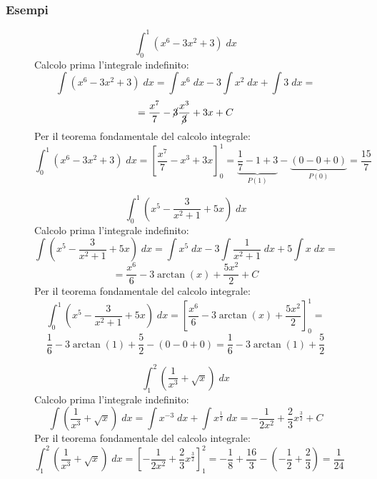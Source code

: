 \documentclass[a4paper]{article}
\theoremstyle{break}
\theoremstyle{break}
\theoremstyle{break}
\theoremstyle{break}
\begin{document}
\subsubsection{Esempi}
\begin{figure}[H]
  \begin{example}
    \[
      \int_{0}^{1} (x^6 - 3x^2 + 3)\; dx
    \] 
    Calcolo prima l'integrale indefinito:
    \[
      \int (x^6 - 3x^2 + 3)\;dx = \int x^6\;dx - 3 \int x^2\;dx + \int 3\;dx =
    \] 
    \[
      = \frac{x^7}{7} - \cancel{3} \frac{x^3}{\cancel{3}} + 3x + C
    \] 
    Per il teorema fondamentale del calcolo integrale:
    \[
      \int_{0}^{1} (x^6 - 3x^2 + 3)\;dx = \left[ \frac{x^7}{7} - x^3 + 3x \right]_{0}^{1} = \underbrace{\frac{1}{7} - 1 + 3}_{P(1)} - \underbrace{(0 - 0 + 0)}_{P(0)} = \frac{15}{7}
    \] 
  \end{example}
\end{figure}

\begin{figure}[H]
  \begin{example}
    \[
      \int_{0}^{1} \left(x^5 - \frac{3}{x^2+1} + 5x \right)\; dx
    \] 
    Calcolo prima l'integrale indefinito:
    \[
      \int \left(x^5 - \frac{3}{x^2+1} + 5x \right)\;dx = \int x^5\;dx - 3 \int \frac{1}{x^2+1}\;dx + 5 \int x\;dx =
    \] 
    \[
      = \frac{x^6}{6} - 3 \arctan(x) + \frac{5x^2}{2} + C
    \] 
    Per il teorema fondamentale del calcolo integrale:
    \[
      \int_{0}^{1} \left(x^5 - \frac{3}{x^2+1} + 5x \right)\;dx = \left[ \frac{x^6}{6} - 3 \arctan(x) + \frac{5x^2}{2} \right]_{0}^{1} =
    \] 
    \[
      \frac{1}{6} - 3 \arctan(1) + \frac{5}{2} - (0 - 0 + 0) = \frac{1}{6} - 3 \arctan(1) + \frac{5}{2}
    \] 
  \end{example}
\end{figure}

\begin{figure}[H]
  \begin{example}
    \[
      \int_{1}^{2} \left( \frac{1}{x^3} + \sqrt{x}  \right)\; dx
    \] 
    Calcolo prima l'integrale indefinito:
    \[
      \int \left( \frac{1}{x^3} + \sqrt{x}  \right)\; dx = \int x^{-3} \;dx + \int x^{\frac{1}{2}} \;dx = -\frac{1}{2x^2} + \frac{2}{3} x^{\frac{3}{2}} + C
    \] 
    Per il teorema fondamentale del calcolo integrale:
    \[
      \int_{1}^{2} \left( \frac{1}{x^3} + \sqrt{x}  \right)\; dx = \left[ -\frac{1}{2x^2} + \frac{2}{3} x^{\frac{3}{2}} \right]_{1}^{2} = -\frac{1}{8} + \frac{16}{3} - \left( -\frac{1}{2} + \frac{2}{3} \right) = \frac{1}{24}
    \] 
  \end{example}
\end{figure}
\end{document}
